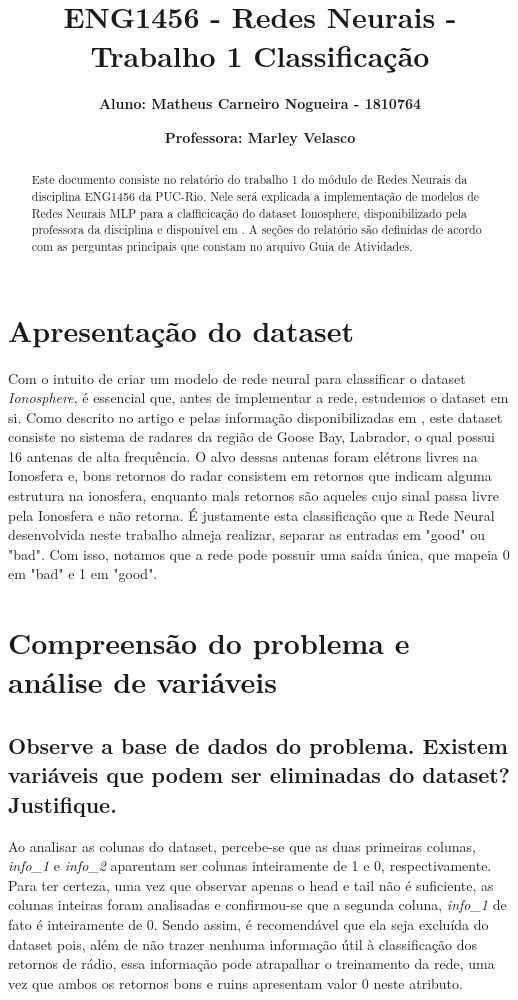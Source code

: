 \documentclass[12pt]{article}
\title{\textbf{ENG1456 - Redes Neurais - Trabalho 1 Classificação}}
\author{\textbf{Aluno: Matheus Carneiro Nogueira - 1810764}}
\affil{}
\author{\textbf{Professora: Marley Velasco}}
\affil{}
\date{}
\begin{document}
	\maketitle
	\tableofcontents
	
\begin{abstract}
	Este documento consiste no relatório do trabalho 1 do módulo de Redes Neurais da disciplina ENG1456 da PUC-Rio. Nele será explicada a implementação de modelos de Redes Neurais MLP para a clafficicação do dataset Ionosphere, disponibilizado pela professora da disciplina e disponível em \cite{Dataset}. A seções do relatório são definidas de acordo com as perguntas principais que constam no arquivo Guia de Atividades.
\end{abstract}

\section{Apresentação do dataset}\label{sec:apresentacao}

Com o intuito de criar um modelo de rede neural para classificar o dataset \textit{Ionosphere}, é essencial que, antes de implementar a rede, estudemos o dataset em si. Como descrito no artigo \cite{Paper1989} e pelas informação disponibilizadas em \cite{Dataset}, este dataset consiste no sistema de radares da região de Goose Bay, Labrador, o qual possui 16 antenas de alta frequência. O alvo dessas antenas foram elétrons livres na Ionosfera e, bons retornos do radar consistem em retornos que indicam alguma estrutura na ionosfera, enquanto mals retornos são aqueles cujo sinal passa livre pela Ionosfera e não retorna. É justamente esta classificação que a Rede Neural desenvolvida neste trabalho almeja realizar, separar as entradas em "good" ou "bad". Com isso, notamos que a rede pode possuir uma saída única, que mapeia 0 em "bad" e 1 em "good".

\section{Compreensão do problema e análise de variáveis}

\subsection{Observe a base de dados do problema. Existem variáveis que podem ser	eliminadas do dataset? Justifique.}\label{subsec:eliminadas}

Ao analisar as colunas do dataset, percebe-se que as duas primeiras colunas, \textit{info\_1} e \textit{info\_2} aparentam ser colunas inteiramente de 1 e 0, respectivamente. Para ter certeza, uma vez que observar apenas o head e tail não é suficiente, as colunas inteiras foram analisadas e confirmou-se que a segunda coluna, \textit{info\_1} de fato é inteiramente de 0. Sendo assim, é recomendável que ela seja excluída do dataset pois, além de não trazer nenhuma informação útil à classificação dos retornos de rádio, essa informação pode atrapalhar o treinamento da rede, uma vez que ambos os retornos bons e ruins apresentam valor 0 neste atributo.
\end{document}
